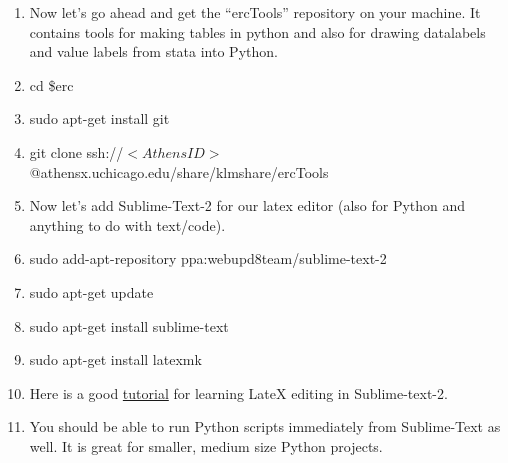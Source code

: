 \documentclass{article}
\begin{document}
\begin{enumerate}
\item Now let's go ahead and get the ``ercTools'' repository on your machine. It contains tools for making tables in python and also for drawing datalabels and value labels from stata into Python. 

\item cd \$erc

\item sudo apt-get install git

\item git clone ssh://$<Athens ID>$@athensx.uchicago.edu/share/klmshare/ercTools

\item Now let's add Sublime-Text-2 for our latex editor (also for Python and anything to do with text/code). 

\item sudo add-apt-repository ppa:webupd8team/sublime-text-2

\item sudo apt-get update

\item sudo apt-get install sublime-text

\item sudo apt-get install latexmk

\item Here is a good \href{http://www.practicallyefficient.com/home/2012/11/29/working-with-latex-in-sublime-text-2}{tutorial} for learning LateX editing in Sublime-text-2. 

\item You should be able to run Python scripts immediately from Sublime-Text as well. It is great for smaller, medium size Python projects. 

\end{enumerate}
\end{document}
